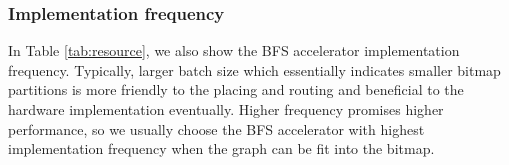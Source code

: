 \subsubsection{Implementation frequency}
In Table \ref{tab:resource}, we also show the BFS accelerator implementation frequency.
Typically, larger batch size which essentially indicates smaller bitmap partitions
is more friendly to the placing and routing and beneficial to the hardware implementation 
eventually. Higher frequency promises higher performance, so we usually choose the BFS 
accelerator with highest implementation frequency when the graph can be fit into the bitmap.

